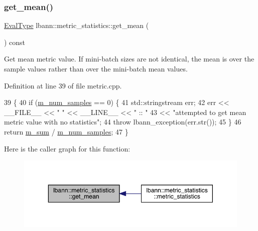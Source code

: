\subsubsection{\texorpdfstring{get\+\_\+mean()}{get\_mean()}}
{\footnotesize\ttfamily \hyperlink{base_8hpp_a3266f5ac18504bbadea983c109566867}{Eval\+Type} lbann\+::metric\+\_\+statistics\+::get\+\_\+mean (\begin{DoxyParamCaption}{ }\end{DoxyParamCaption}) const}

Get mean metric value. If mini-\/batch sizes are not identical, the mean is over the sample values rather than over the mini-\/batch mean values. 

Definition at line 39 of file metric.\+cpp.


\begin{DoxyCode}
39                                            \{
40   \textcolor{keywordflow}{if} (\hyperlink{structlbann_1_1metric__statistics_a6633bf91863b7e2327563ac93a9783f7}{m\_num\_samples} == 0) \{
41     std::stringstream err;
42     err << \_\_FILE\_\_ << \textcolor{stringliteral}{" "} << \_\_LINE\_\_ << \textcolor{stringliteral}{" :: "}
43         << \textcolor{stringliteral}{"attempted to get mean metric value with no statistics"};
44     \textcolor{keywordflow}{throw} lbann\_exception(err.str());
45   \}
46   \textcolor{keywordflow}{return} \hyperlink{structlbann_1_1metric__statistics_a3481b2bb165e12a52db847f40a70f800}{m\_sum} / \hyperlink{structlbann_1_1metric__statistics_a6633bf91863b7e2327563ac93a9783f7}{m\_num\_samples};
47 \}
\end{DoxyCode}
Here is the caller graph for this function\+:\nopagebreak
\begin{figure}[H]
\begin{center}
\leavevmode
\includegraphics[width=350pt]{structlbann_1_1metric__statistics_ac3cb1abfc32b090fa2a08bda6afa5c09_icgraph}
\end{center}
\end{figure}
\mbox{\label{structlbann_1_1metric__statistics_a24e7c8d8ecc2a02279d73b908fc97133}} 
